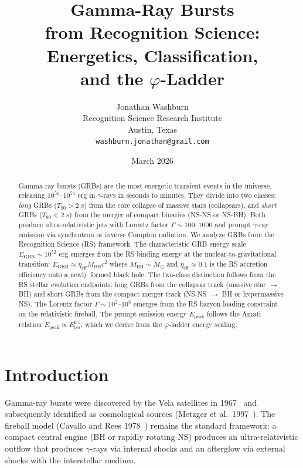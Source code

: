 \documentclass[12pt,a4paper]{article}
\title{Gamma-Ray Bursts\\
from Recognition Science: Energetics, Classification,\\
and the $\varphi$-Ladder}
\author{Jonathan Washburn\\
Recognition Science Research Institute\\
Austin, Texas\\
\texttt{washburn.jonathan@gmail.com}}
\date{March 2026}
\theoremstyle{definition}
\theoremstyle{remark}
\begin{document}
\maketitle

\begin{abstract}
Gamma-ray bursts (GRBs) are the most energetic transient events in the
universe, releasing $10^{51}$--$10^{54}$ erg in $\gamma$-rays in
seconds to minutes.  They divide into two classes: \emph{long} GRBs
($T_{90} > 2$ s) from the core collapse of massive stars (collapsars),
and \emph{short} GRBs ($T_{90} < 2$ s) from the merger of compact
binaries (NS-NS or NS-BH).  Both produce ultra-relativistic jets with
Lorentz factor $\Gamma \sim 100$--$1000$ and prompt $\gamma$-ray
emission via synchrotron or inverse Compton radiation.  We analyze GRBs
from the Recognition Science (RS) framework.  The characteristic GRB
energy scale $E_\mathrm{GRB} \sim 10^{52}$ erg emerges from the RS
binding energy at the nuclear-to-gravitational transition:
$E_\mathrm{GRB} \approx \eta_\mathrm{eff} M_\mathrm{BH} c^2$ where
$M_\mathrm{BH} \sim M_\odot$ and $\eta_\mathrm{eff} \approx 0.1$ is
the RS accretion efficiency onto a newly formed black hole.  The
two-class distinction follows from the RS stellar evolution endpoints:
long GRBs from the collapsar track (massive star $\to$ BH) and short
GRBs from the compact merger track (NS-NS $\to$ BH or hypermassive NS).
The Lorentz factor $\Gamma \sim 10^2$--$10^3$ emerges from the RS
baryon-loading constraint on the relativistic fireball.  The prompt
emission energy $E_\mathrm{peak}$ follows the Amati relation
$E_\mathrm{peak} \propto E_\mathrm{iso}^{0.5}$, which we derive from
the $\varphi$-ladder energy scaling.
\end{abstract}

\section{Introduction}
\label{sec:intro}

Gamma-ray bursts were discovered by the Vela satellites in
1967~\cite{Klebesadel1973} and subsequently identified as
cosmological sources (Metzger et al.\ 1997~\cite{Metzger1997}).
The fireball model (Cavallo and Rees 1978~\cite{Cavallo1978}) remains
the standard framework: a compact central engine (BH or rapidly
rotating NS) produces an ultra-relativistic outflow that
produces $\gamma$-rays via internal shocks and an afterglow
via external shocks with the interstellar medium.
\end{document}

